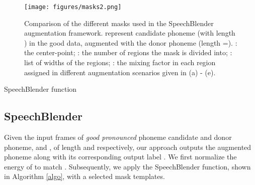 \documentclass{INTERSPEECH2023}
\begin{document}
\begin{figure*} [!ht]
\centering
\vspace{-0.4cm}
\texttt{[image: figures/masks2.png]}
\vspace{-0.5cm}
\caption{Comparison of the different masks used in the SpeechBlender augmentation framework.  represent candidate phoneme (with length ) in the good data, augmented with the donor phoneme  (length =). 
: the center-point; : the number of regions the mask is divided into; : list of widths of the regions; : the mixing factor in each region assigned in different augmentation scenarios given in (a) - (e). }
\label{fig:mask_types}
\vspace{-0.2cm}
\end{figure*}


\begin{algorithm}[h]
\caption{SpeechBlender function}
\SetAlgoLined
{}

\label{algo}
\end{algorithm}
\vspace{-0.2cm}

\subsection{SpeechBlender}
Given the input frames of \textit{good pronounced} phoneme candidate and donor phoneme,  and , of length  and  respectively, our approach outputs the augmented phoneme  along with its corresponding output label . We first normalize the energy of  to match . Subsequently, we apply the SpeechBlender function, shown in Algorithm \ref{algo}, with a selected mask templates.   
\end{document}
